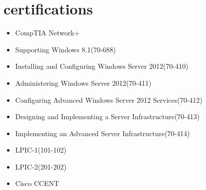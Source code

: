 \documentclass[]{friggeri-cv} %
\begin{document}
\section{certifications}
\begin{itemize}
	\item CompTIA Network+
	\item Supporting Windows 8.1(70-688)
	\item Installing and Configuring Windows Server 2012(70-410)
	\item Administering Windows Server 2012(70-411)
	\item Configuring Advanced Windows Server 2012 Services(70-412)
	\item Designing and Implementing a Server Infrastructure(70-413)
	\item Implementing an Advanced Server Infrastructure(70-414)
	\item LPIC-1(101-102)
	\item LPIC-2(201-202)
	\item Cisco CCENT
\end{itemize}
\end{document}
